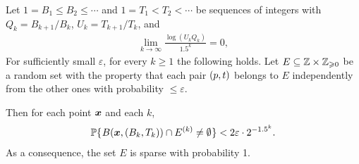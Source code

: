 \documentclass[12pt]{memoir}
\def\B{B}
\def\U{U}
\newcommand{\Tu}{T}
\begin{document}
\begin{lemma}[Sparsity]\label{lem:sparsiness}
Let \( 1=\B_{1}\le  \B_{2}\le\dotsm \) and 
\( 1=\Tu_{1}<T_{2}<\dotsm \) be sequences of integers with
\( Q_k = B_{k+1}/B_{k} \), \( \U_k = \Tu_{k+1}/\Tu_{k} \), and
\begin{align}\label{eq:assumption}
  \lim_{k\rightarrow\infty}\frac{\log(\U_{k} Q_k)}{1.5^k}=0,
\end{align}
For sufficiently small \( \varepsilon \), for every \( k\ge 1 \) the following holds.
Let \( E\subseteq \mathbb{Z}\times \mathbb{Z}_{\geqslant 0} \)
be a random set with the property that each pair \( (p,t) \) belongs to \( E \)
independently from the other ones with probability \( \le \varepsilon \).

Then for each point \( \boldsymbol{x} \)  and each \( k \),
 \begin{align*}
   \Pbof{B(\vek{x},(\B_k, \Tu_{k}))\cap E^{(k)}\neq\emptyset} <2\varepsilon \cdot 2^{-1.5^{k}}.
 \end{align*}
As a consequence, the set \( E \) is sparse with probability 1.
\end{lemma}
\end{document}
